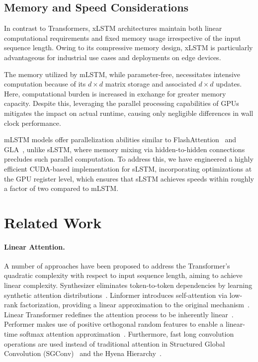 \subsection{Memory and Speed Considerations}

In contrast to Transformers, xLSTM architectures maintain both linear computational requirements and fixed memory usage irrespective of the input sequence length. Owing to its compressive memory design, xLSTM is particularly advantageous for industrial use cases and deployments on edge devices.

The memory utilized by mLSTM, while parameter-free, necessitates intensive computation because of its $d \times d$ matrix storage and associated $d \times d$ updates. Here, computational burden is increased in exchange for greater memory capacity. Despite this, leveraging the parallel processing capabilities of GPUs mitigates the impact on actual runtime, causing only negligible differences in wall clock performance.

mLSTM models offer parallelization abilities similar to FlashAttention~\citep{Dao:22,Dao:23} and GLA~\citep{Yang:23arxiv}, unlike sLSTM, where memory mixing via hidden-to-hidden connections precludes such parallel computation. To address this, we have engineered a highly efficient CUDA-based implementation for sLSTM, incorporating optimizations at the GPU register level, which ensures that sLSTM achieves speeds within roughly a factor of two compared to mLSTM.

\section{Related Work}
\label{sec:related}

\paragraph{Linear Attention.} A number of approaches have been proposed to address the Transformer's quadratic complexity with respect to input sequence length, aiming to achieve linear complexity. Synthesizer eliminates token-to-token dependencies by learning synthetic attention distributions~\citep{Tay:20arxiv}. Linformer introduces self-attention via low-rank factorization, providing a linear approximation to the original mechanism~\citep{Wang:20arxiv}. Linear Transformer redefines the attention process to be inherently linear~\citep{Katharopoulos:20}. Performer makes use of positive orthogonal random features to enable a linear-time softmax attention approximation~\citep{Choromanski:21}. Furthermore, fast long convolution operations are used instead of traditional attention in Structured Global Convolution (SGConv)~\citep{Li:22} and the Hyena Hierarchy~\citep{Poli:23}.

